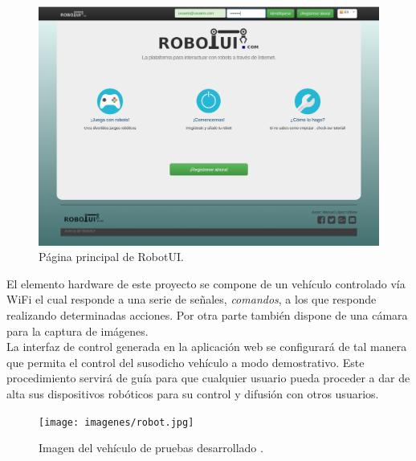 \documentclass[a4paper,12pt]{article}
\begin{document}
\begin{figure}[H]
  \begin{center}
    \includegraphics[scale=0.25]{imagenes/pagina-principal.png}
  \end{center}
 \caption{Página principal de RobotUI.}
\end{figure}


El elemento hardware de este proyecto se compone de un vehículo controlado vía WiFi el cual responde a una serie de señales, \emph{comandos}, a los que responde realizando determinadas acciones. Por otra parte también dispone de una cámara para la captura de imágenes.\\

La interfaz de control generada en la aplicación web se configurará de tal manera que permita el control del susodicho vehículo a modo demostrativo. Este procedimiento servirá de guía para que cualquier usuario pueda proceder a dar de alta sus dispositivos 
robóticos para su control y difusión con otros usuarios.\\

\begin{figure}[H]
  \begin{center}
    \texttt{[image: imagenes/robot.jpg]}
  \end{center}
  \label{fig:logo}
 \caption{Imagen del vehículo de pruebas desarrollado \protect\footnotemark.}
\end{figure}

\end{document}
